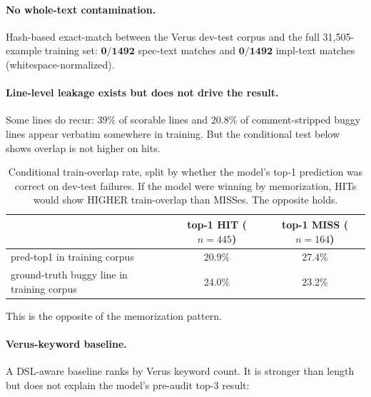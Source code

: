 \documentclass[10pt]{article}
\begin{document}
\paragraph{No whole-text contamination.} Hash-based exact-match between
the Verus dev-test corpus and the full 31{,}505-example training set:
$\mathbf{0/1492}$ spec-text matches and $\mathbf{0/1492}$ impl-text
matches (whitespace-normalized).

\paragraph{Line-level leakage exists but does not drive the result.}
Some lines do recur: $39\%$ of scorable lines and $20.8\%$ of
comment-stripped buggy lines appear verbatim somewhere in training. But
the conditional test below shows overlap is not higher on hits.

\begin{table}[htbp]
\centering
\caption{Conditional train-overlap rate, split by whether the model's
top-1 prediction was correct on dev-test failures. If the model were winning
by memorization, HITs would show HIGHER train-overlap than MISSes.
The opposite holds.}
\label{tab:leak-conditional}
\small
\begin{tabular}{lcc}
\toprule
                                            & top-1 HIT ($n{=}445$) & top-1 MISS ($n{=}164$) \\
\midrule
pred-top1 in training corpus                & 20.9\%                & 27.4\%                  \\
ground-truth buggy line in training corpus  & 24.0\%                & 23.2\%                  \\
\bottomrule
\end{tabular}
\end{table}

This is the opposite of the memorization pattern.

\paragraph{Verus-keyword baseline.}
A DSL-aware baseline ranks by Verus keyword count. It is stronger than
length but does not explain the model's pre-audit top-$3$ result:
\end{document}
